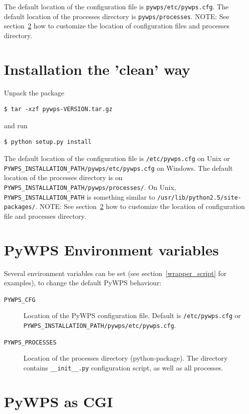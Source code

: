 \documentclass[a4paper,11pt]{report}
\begin{document}
The default location of the configuration file is
\texttt{pywps/etc/pywps.cfg}. The default location of the processes
directory is \texttt{pywps/processes}. NOTE: See
section~\ref{environment_variables} how to customize the location of
configuration files and processes directory.

\section{Installation the 'clean' way}
Unpack the package 
\begin{verbatim}
$ tar -xzf pywps-VERSION.tar.gz
\end{verbatim}
and run 
\begin{verbatim}
$ python setup.py install
\end{verbatim} 

The default location of the configuration file is
\texttt{/etc/pywps.cfg} on Unix or
\texttt{PYWPS\_INSTALLATION\_PATH/pywps/etc/pywps.cfg} on Windows. The default location of the processes
directory is on \texttt{PYWPS\_INSTALLATION\_PATH/pywps/processes/}. On
Unix, \texttt{PYWPS\_INSTALLATION\_PATH} is something similar to
\texttt{/usr/lib/python2.5/site-packages/}.
NOTE: See section~\ref{environment_variables} how to customize the location of
configuration file and processes directory.

\section{PyWPS Environment variables}
\label{environment_variables}
Several environment variables can be set (see section~\ref{wrapper_script}
for examples), to change the default PyWPS behaviour:
\begin{description}
    \item[\texttt{PYWPS\_CFG}] Location of the PyWPS configuration file.
    Default is \texttt{/etc/pywps.cfg} or
    \texttt{PYWPS\_INSTALLATION\_PATH/pywps/etc/pywps.cfg}.

    \item[\texttt{PYWPS\_PROCESSES}] Location of the processes directory
    (python-package). The directory contains \texttt{\_\_init\_\_.py}
    configuration script, as well as all processes.
\end{description}

\section{PyWPS as CGI}
\end{document}
